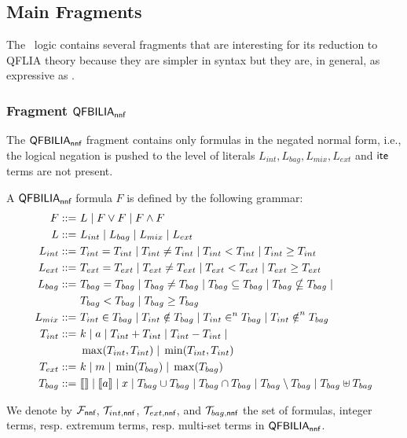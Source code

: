 \subsection{Main Fragments}
\label{ssec:frag}

The \QFBILIA\ logic contains several fragments that are interesting for its reduction to QFLIA theory because
they are simpler in syntax but they are, in general, as expressive as \QFBILIA.

\subsubsection{Fragment $\textsf{QFBILIA}_{\textsf{nnf}}$}
\label{sssec:nnf}

The $\textsf{QFBILIA}_{\textsf{nnf}}$ fragment contains only formulas in the negated normal form, i.e., the logical negation is pushed to the level of literals $L_{int}, L_{bag}, L_{mix}, L_{ext}$ and $\textsf{ite}$ terms are not present.

\begin{mydef}
\label{def:nnf}
A $\textsf{QFBILIA}_{\textsf{nnf}}$ formula $F$ is defined by the following grammar:
\begin{align*}
F ::= &\ L \; | \; F\lor F \; | \; F\land F
\\
L ::= &\ L_{int} \; |\; L_{bag} \; |\; L_{mix} \; |\; L_{ext}
\\
L_{int} ::= &\ T_{int} = T_{int} \; |\; T_{int} \neq T_{int} \; |\; T_{int} < T_{int}\; |\; T_{int} \ge T_{int}
\\
L_{ext} ::= &\ T_{ext} = T_{ext} \; |\; T_{ext} \neq T_{ext} \; |\; T_{ext} < T_{ext}\; |\;  T_{ext} \ge T_{ext}
\\
L_{bag} ::= &\  T_{bag} = T_{bag} \; |\;T_{bag} \neq T_{bag} \; |\;T_{bag} \subseteq T_{bag} \; |\;T_{bag} \nsubseteq T_{bag} \; | \; \notag\\
&\ T_{bag} < T_{bag} \; |\;T_{bag} \ge T_{bag}
\\
L_{mix}  ::=  &\ T_{int} \in T_{bag}\; |\;T_{int} \notin T_{bag}\; |\;T_{int} \in^{n} T_{bag}\; |\;T_{int} \notin^{n} T_{bag}
\notag\\
T_{int} ::= &\  k \;|\; a \;|\; T_{int} + T_{int} \;|\; T_{int} - T_{int}\;|\;
\\
&\ \max(T_{int},T_{int})\;|\; \min(T_{int},T_{int})
\\
T_{ext} ::= &\ k \;|\; m \;|\; \min(T_{bag}) \;|\; \max(T_{bag})
\\
T_{bag} ::=  &\  \llbracket  \rrbracket\;|\;\llbracket a \rrbracket \;|\;x \;|\; T_{bag} \cup T_{bag} \;|\; T_{bag} \cap T_{bag}\;|\; T_{bag} \setminus T_{bag}\;|\; T_{bag} \uplus T_{bag}
\end{align*}

We denote by $\mathcal{F}_{\textsf{nnf}}$, $\mathcal{T}_{int,\textsf{nnf}}$, $\mathcal{T}_{ext,\textsf{nnf}}$, and $\mathcal{T}_{bag,\textsf{nnf}}$ the set of formulas, integer terms, resp. extremum terms, resp. multi-set terms  in $\textsf{QFBILIA}_{\textsf{nnf}}$.
\end{mydef}



